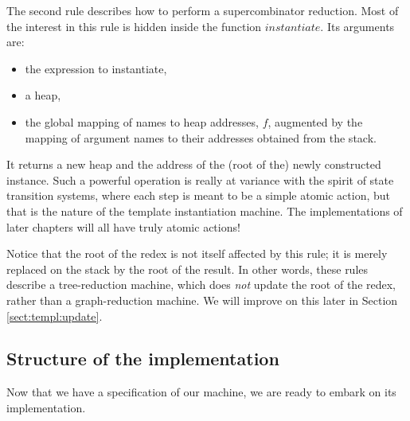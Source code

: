 The second rule describes how to perform a
supercombinator reduction.
\label{rule:sc1}
Most of the interest in this rule is hidden inside the
function $instantiate$.  Its arguments are:
\begin{itemize}
\item
the expression to instantiate,
\item
a heap,
\item
the global mapping of names to heap addresses, $f$, augmented
by the mapping of argument names to their addresses obtained from the
stack.
\end{itemize}
It returns a new heap and the address of the (root of the) newly constructed
instance.
Such a powerful operation is
really at variance with the spirit of state transition systems,
where each step is meant to be a simple atomic action, but that is the
nature of the template instantiation machine.
The implementations of later chapters will all have truly atomic actions!

Notice that the root of the redex is not itself affected by this rule;
it is merely replaced on the stack by the root of the result.
In other words, these rules describe a tree-reduction machine,
which does {\em not\/} update
the root of the redex, rather
than a graph-reduction
machine.
We will improve on this later in Section \ref{sect:templ:update}.

\subsection{Structure of the implementation}

Now that we have a specification of our machine, we are ready
to embark on its implementation.

